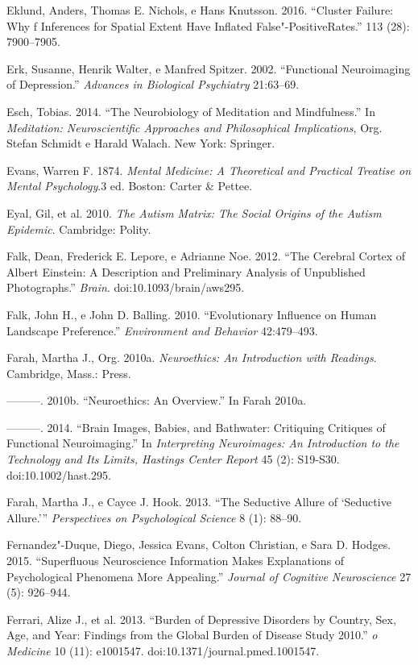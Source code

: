 Eklund, Anders, Thomas E. Nichols, e Hans Knutsson. 2016. ``Cluster
Failure: Why f Inferences for Spatial Extent Have Inflated
False"-PositiveRates.'' \emph{} 113 (28): 7900--7905.

Erk, Susanne, Henrik Walter, e Manfred Spitzer. 2002. ``Functional
Neuroimaging of Depression.'' \emph{Advances in Biological Psychiatry}
21:63--69.

Esch, Tobias. 2014. ``The Neurobiology of Meditation and Mindfulness.''
In \emph{Meditation: Neuroscientific Approaches and Philosophical
Implications}, Org. Stefan Schmidt e Harald Walach. New York: Springer.

Evans, Warren F. 1874. \emph{Mental Medicine: A Theoretical and
Practical Treatise on Mental Psychology}.3 ed. Boston: Carter \& Pettee.

Eyal, Gil, et al. 2010. \emph{The Autism Matrix: The Social Origins of
the Autism Epidemic}. Cambridge: Polity.

Falk, Dean, Frederick E. Lepore, e Adrianne Noe. 2012. ``The Cerebral
Cortex of Albert Einstein: A Description and Preliminary Analysis of
Unpublished Photographs.'' \emph{Brain}. doi:10.1093/brain/aws295.

Falk, John H., e John D. Balling. 2010. ``Evolutionary Influence on
Human Landscape Preference.'' \emph{Environment and Behavior}
42:479--493.

Farah, Martha J., Org. 2010a. \emph{Neuroethics: An Introduction with
Readings}. Cambridge, Mass.:  Press.

---------. 2010b. ``Neuroethics: An Overview.'' In Farah 2010a.

---------. 2014. ``Brain Images, Babies, and Bathwater: Critiquing
Critiques of Functional Neuroimaging.'' In \emph{Interpreting
Neuroimages: An Introduction to the Technology and Its Limits, Hastings
Center Report} 45 (2): S19-S30. doi:10.1002/hast.295.

Farah, Martha J., e Cayce J. Hook. 2013. ``The Seductive Allure of
`Seductive Allure.''' \emph{Perspectives on Psychological Science} 8
(1): 88--90.

Fernandez"-Duque, Diego, Jessica Evans, Colton Christian, e Sara D.
Hodges. 2015. ``Superfluous Neuroscience Information Makes Explanations
of Psychological Phenomena More Appealing.'' \emph{Journal of Cognitive
Neuroscience} 27 (5): 926--944.

Ferrari, Alize J., et al. 2013. ``Burden of Depressive Disorders by
Country, Sex, Age, and Year: Findings from the Global Burden of Disease
Study 2010.'' \emph{o Medicine} 10 (11): e1001547.
doi:10.1371/journal.pmed.1001547.

